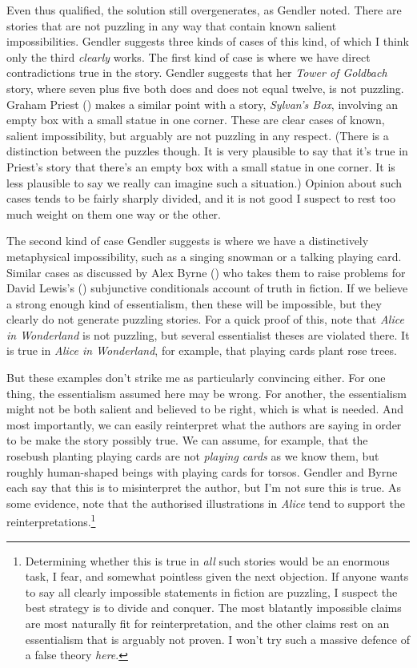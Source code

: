 \documentclass[
  10pt,
  letterpaper,
  DIV=11,
  numbers=noendperiod,
  twoside]{scrartcl}
\begin{document}
Even thus qualified, the solution still overgenerates, as Gendler noted.
There are stories that are not puzzling in any way that contain known
salient impossibilities. Gendler suggests three kinds of cases of this
kind, of which I think only the third \emph{clearly} works. The first
kind of case is where we have direct contradictions true in the story.
Gendler suggests that her \emph{Tower of Goldbach} story, where seven
plus five both does and does not equal twelve, is not puzzling. Graham
Priest () makes a similar point with a
story, \emph{Sylvan's Box}, involving an empty box with a small statue
in one corner. These are clear cases of known, salient impossibility,
but arguably are not puzzling in any respect. (There is a distinction
between the puzzles though. It is very plausible to say that it's true
in Priest's story that there's an empty box with a small statue in one
corner. It is less plausible to say we really can imagine such a
situation.) Opinion about such cases tends to be fairly sharply divided,
and it is not good I suspect to rest too much weight on them one way or
the other.

The second kind of case Gendler suggests is where we have a
distinctively metaphysical impossibility, such as a singing snowman or a
talking playing card. Similar cases as discussed by Alex Byrne
() who takes them to raise problems for
David Lewis's () subjunctive conditionals
account of truth in fiction. If we believe a strong enough kind of
essentialism, then these will be impossible, but they clearly do not
generate puzzling stories. For a quick proof of this, note that
\emph{Alice in Wonderland} is not puzzling, but several essentialist
theses are violated there. It is true in \emph{Alice in Wonderland}, for
example, that playing cards plant rose trees.

But these examples don't strike me as particularly convincing either.
For one thing, the essentialism assumed here may be wrong. For another,
the essentialism might not be both salient and believed to be right,
which is what is needed. And most importantly, we can easily reinterpret
what the authors are saying in order to be make the story possibly true.
We can assume, for example, that the rosebush planting playing cards are
not \emph{playing cards} as we know them, but roughly human-shaped
beings with playing cards for torsos. Gendler and Byrne each say that
this is to misinterpret the author, but I'm not sure this is true. As
some evidence, note that the authorised illustrations in \emph{Alice}
tend to support the reinterpretations.\footnote{Determining whether this
  is true in \emph{all} such stories would be an enormous task, I fear,
  and somewhat pointless given the next objection. If anyone wants to
  say all clearly impossible statements in fiction are puzzling, I
  suspect the best strategy is to divide and conquer. The most blatantly
  impossible claims are most naturally fit for reinterpretation, and the
  other claims rest on an essentialism that is arguably not proven. I
  won't try such a massive defence of a false theory \emph{here}.}
\end{document}
